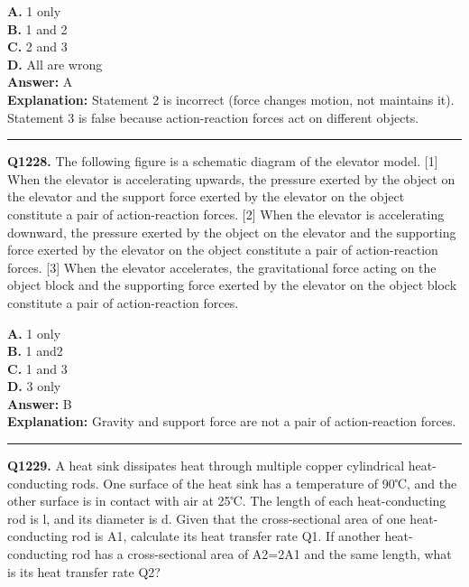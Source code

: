 \documentclass[12pt]{article}
\begin{document}
\textbf{A.} 1 only \\
\textbf{B.} 1 and 2 \\
\textbf{C.} 2 and 3 \\
\textbf{D.} All are wrong \\

\textbf{Answer:} A \\
\textbf{Explanation:} Statement 2 is incorrect (force changes motion, not maintains it). Statement 3 is false because action-reaction forces act on different objects.

\hrule
\vspace{1em}


\noindent
\textbf{Q1228.} The following figure is a schematic diagram of the elevator model.
[1]
When the elevator is accelerating upwards, the pressure exerted by the object on the elevator and the support force exerted by the elevator on the object constitute a pair of action-reaction forces.
[2]
When the elevator is accelerating downward, the pressure exerted by the object on the elevator and the supporting force exerted by the elevator on the object constitute a pair of action-reaction forces.
[3]
When the elevator accelerates, the gravitational force acting on the object block and the supporting force exerted by the elevator on the object block constitute a pair of action-reaction forces.



\textbf{A.} 1 only \\
\textbf{B.} 1 and2 \\
\textbf{C.} 1 and 3 \\
\textbf{D.} 3 only \\

\textbf{Answer:} B \\
\textbf{Explanation:} Gravity and support force are not a pair of action-reaction forces.

\hrule
\vspace{1em}


\noindent
\textbf{Q1229.} A heat sink dissipates heat through multiple copper cylindrical heat-conducting rods. One surface of the heat sink has a temperature of 90℃, and the other surface is in contact with air at 25℃. The length of each heat-conducting rod is l, and its diameter is d. Given that the cross-sectional area of one heat-conducting rod is A1​, calculate its heat transfer rate Q1​. If another heat-conducting rod has a cross-sectional area of A2​=2A1​ and the same length, what is its heat transfer rate Q2​?
\end{document}
